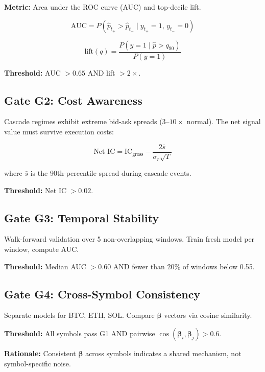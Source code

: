 \documentclass[11pt,a4paper]{article}
\begin{document}
\textbf{Metric:} Area under the ROC curve (AUC) and top-decile lift.

\begin{equation}
\text{AUC} = P(\hat{p}_{t_+} > \hat{p}_{t_-} \mid y_{t_+} = 1,\, y_{t_-} = 0)
\end{equation}

\begin{equation}
\text{lift}(q) = \frac{P(y = 1 \mid \hat{p} > q_{90})}{P(y = 1)}
\end{equation}

\textbf{Threshold:} AUC $> 0.65$ AND lift $> 2\times$.

\subsection{Gate G2: Cost Awareness}

Cascade regimes exhibit extreme bid-ask spreads (3--$10\times$ normal). The net signal value must survive execution costs:

\begin{equation}
\text{Net IC} = \text{IC}_{\text{gross}} - \frac{2 \bar{s}}{\sigma_r \sqrt{T}}
\end{equation}

where $\bar{s}$ is the 90th-percentile spread during cascade events.

\textbf{Threshold:} Net IC $> 0.02$.

\subsection{Gate G3: Temporal Stability}

Walk-forward validation over 5 non-overlapping windows. Train fresh model per window, compute AUC.

\textbf{Threshold:} Median AUC $> 0.60$ AND fewer than 20\% of windows below 0.55.

\subsection{Gate G4: Cross-Symbol Consistency}

Separate models for BTC, ETH, SOL. Compare $\boldsymbol{\beta}$ vectors via cosine similarity.

\textbf{Threshold:} All symbols pass G1 AND pairwise $\cos(\boldsymbol{\beta}_i, \boldsymbol{\beta}_j) > 0.6$.

\textbf{Rationale:} Consistent $\boldsymbol{\beta}$ across symbols indicates a shared mechanism, not symbol-specific noise.
\end{document}
